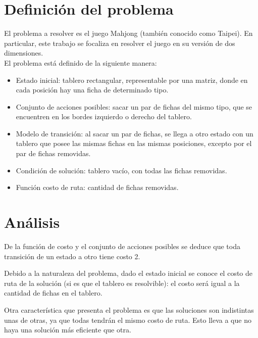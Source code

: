 \documentclass[a4paper,10pt]{article}
\begin{document}
\setcounter{page}{1}


\section{Definición del problema}

    El problema a resolver es el juego Mahjong (también conocido como Taipei). En particular, este trabajo se focaliza en resolver el juego en su versión de dos dimensiones. \\

    El problema está definido de la siguiente manera:

    \begin{itemize}
        \item Estado inicial: tablero rectangular, representable por una matriz, donde en cada posición hay una ficha de determinado tipo.
        \item Conjunto de acciones posibles: sacar un par de fichas del mismo tipo, que se encuentren en los bordes izquierdo o derecho del tablero.
        \item Modelo de transición: al sacar un par de fichas, se llega a otro estado con un tablero que posee las mismas fichas en las mismas posiciones, excepto por el par de fichas removidas.
        \item Condición de solución: tablero vacío, con todas las fichas removidas.
        \item Función costo de ruta: cantidad de fichas removidas.
    \end{itemize}

\section{Análisis}

    \label{sec:problem_properties}

    De la función de costo y el conjunto de acciones posibles se deduce que toda transición de un estado a otro tiene costo 2.

    Debido a la naturaleza del problema, dado el estado inicial se conoce el costo de ruta de la solución (si es que el tablero es resolvible): el costo será igual a la cantidad de fichas en el tablero.

    Otra característica que presenta el problema es que las soluciones son indistintas unas de otras, ya que todas tendrán el mismo costo de ruta. Esto lleva a que no haya una solución más eficiente que otra.
\end{document}
